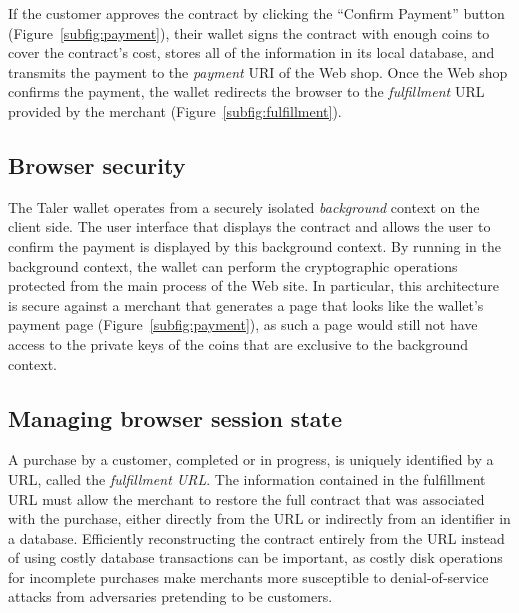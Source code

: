\documentclass{llncs}
\begin{document}
If the customer approves the contract by clicking the ``Confirm
Payment'' button (Figure~\ref{subfig:payment}), their wallet signs the
contract with enough coins to cover the contract's cost, stores all of
the information in its local database, and transmits the payment to
the {\em payment} URI of the Web shop.  Once the Web shop confirms the
payment, the wallet redirects the browser to the {\em fulfillment} URL
provided by the merchant (Figure~\ref{subfig:fulfillment}).

\subsection{Browser security}

The Taler wallet operates from a securely isolated {\em background}
context on the client side.  The user interface that displays the
contract and allows the user to confirm the payment is displayed by
this background context.  By running in the background context, the
wallet can perform the cryptographic operations protected from the
main process of the Web site.  In particular, this architecture is
secure against a merchant that generates a page that looks like the
wallet's payment page (Figure~\ref{subfig:payment}), as such a page
would still not have access to the private keys of the coins that are
exclusive to the background context.


\subsection{Managing browser session state}






A purchase by a customer, completed or in progress, is uniquely
identified by a URL, called the \emph{fulfillment URL}.  The
information contained in the fulfillment URL must allow the merchant
to restore the full contract that was associated with the purchase,
either directly from the URL or indirectly from an identifier in a
database.  Efficiently reconstructing the contract entirely from the
URL instead of using costly database transactions can be important, as
costly disk operations for incomplete purchases make merchants
more susceptible to denial-of-service attacks from adversaries
pretending to be customers.
\end{document}

